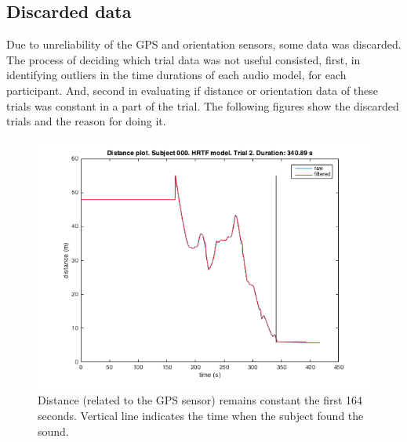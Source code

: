 \documentclass[journal]{IEEEtran}
\begin{document}
\begin{appendices}
\section{Discarded data}

Due to unreliability of the GPS and orientation sensors, some data was discarded. The process of deciding which trial data was not useful consisted, first, in identifying outliers in the time durations of each audio model, for each participant. And, second in evaluating if distance or orientation data of these trials was constant in a part of the trial. The following figures show the discarded trials and the reason for doing it.

\begin{figure}[h!]
  \centering
    \includegraphics[scale=0.5]{graphics/subject000htrftrial2.png}
   \caption{Distance (related to the GPS sensor) remains constant the first 164 seconds. Vertical line indicates the time when the subject found the sound.}
  \label{fig:plt1}
\end{figure}

\setlength{\abovecaptionskip}{15pt plus 3pt minus 2pt} %


\end{appendices}
\end{document}
